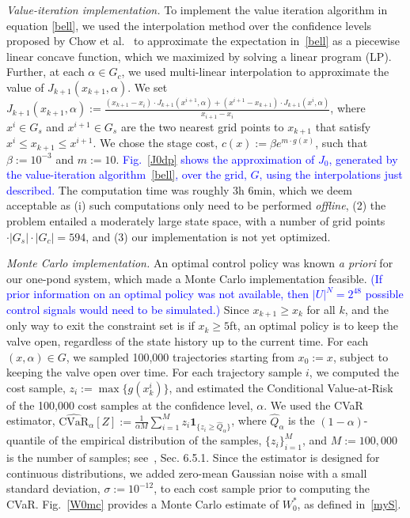 \documentclass[letterpaper, 10 pt, conference]{ieeeconf}  %
\newcommand{\mpc}[1]{{\color{cyan} #1}}
\newcommand{\mpc}[1]{#1}
\begin{document}
\textit{Value-iteration implementation.}
\mpc{To implement the value iteration algorithm in equation \eqref{bell}}, we used the interpolation method over the confidence levels proposed by Chow et al.~\cite{chow2015risk} 
to approximate the expectation in~\eqref{bell} as a piecewise linear concave function, which we maximized by solving a linear program (LP).
Further, at each $\alpha \in G_c$, we used multi-linear interpolation to approximate the value of $J_{k+1}(x_{k+1}, \alpha)$.
We set $J_{k+1}(x_{k+1}, \alpha) := \frac{(x_{k+1} - x_i) \cdot J_{k+1}(x^{i+1}, \alpha) + (x^{i+1} - x_{k+1})  \cdot J_{k+1}(x^i, \alpha)}{x_{i+1}-x_i}$,
where $x^i \in G_s$ and $x^{i+1} \in G_s$ are the two nearest grid points to $x_{k+1}$ that satisfy $x^i \leq x_{k+1} \leq x^{i+1}$.
We chose the stage cost, $c(x) := \beta e^{m \cdot g(x)}$, such that $\beta := 10^{-3}$ and $m := 10$.
\textcolor{blue}{Fig.~\ref{J0dp} shows the approximation of $J_0$, generated by the value-iteration algorithm~\eqref{bell}, over the grid, $G$,
using the interpolations just described.} \mpc{The computation time was roughly 3h 6min, which we deem acceptable as (i) such computations only need to be performed {\em offline}, (2) the problem entailed a moderately large state space, with a number of grid points $\cdot|G_s|\cdot|G_c| = 594$, and (3) our implementation is not yet optimized.} 
 

\textit{Monte Carlo implementation.}
An optimal control policy was known \textit{a priori} for our one-pond system, which made a Monte Carlo implementation feasible.
\textcolor{blue}{(If prior information on an optimal policy was not available, then $|U|^N = 2^{48}$ possible control signals would need to be simulated.)} 
Since $x_{k+1}\geq x_k$ for all $k$, and the only way to exit the constraint set is if $x_k \geq 5$ft,
an optimal policy is to keep the valve open, regardless of the state history up to the current time.
For each $(x,\alpha) \in G$, we sampled 100,000 trajectories starting from $x_0 := x$, subject to keeping the valve open over time.
For each trajectory sample $i$, we computed the cost sample, $z_i := \max\{g(x_k^i)\}$, and estimated the Conditional Value-at-Risk
of the 100,000 cost samples at the confidence level, $\alpha$. 
We used the CVaR estimator, $\widehat{\text{CVaR}}_\alpha[Z] := \frac{1}{\alpha M}\sum_{i=1}^M z_i \textbf{1}_{\{z_i\geq \hat{Q}_\alpha\}}$,
where $\hat{Q}_\alpha$ is the $(1-\alpha)$-quantile of the empirical distribution of the samples, $\{z_i\}_{i=1}^M$,
and $M := 100,000$ is the number of samples; see~\cite{shapiro2009lectures}, Sec. 6.5.1.
Since the estimator is designed for continuous distributions, %
we added zero-mean Gaussian noise with a small standard deviation, $\sigma := 10^{-12}$, to each cost sample prior to computing the CVaR.
Fig.~\ref{W0mc} provides a Monte Carlo estimate of $W_0^*$, as defined in~\eqref{myS}.
\end{document}
